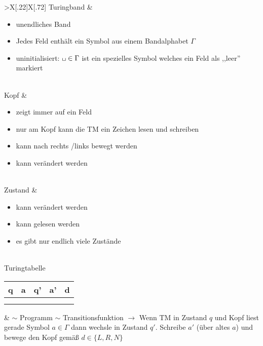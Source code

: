 \begin{tabu}{>{\bfseries}X[.22]X[.72]}
	Turingband & \vspace{-1em}\begin{itemize}[leftmargin=1em,parsep=0pt,topsep=0pt]
	\item unendliches Band
	\item Jedes Feld enthält ein Symbol aus einem Bandalphabet $\Gamma$
	\item uninitialisiert: $\blank\in\Gamma$  ist ein spezielles Symbol welches ein Feld als ,,leer'' markiert
	\end{itemize}
	\\
	Kopf & \vspace{-1em}\begin{itemize}[leftmargin=1em,parsep=0pt,topsep=0pt]
	\item zeigt immer auf ein Feld
	\item nur am Kopf kann die \ac{TM} ein Zeichen lesen und schreiben
	\item kann nach rechts /links bewegt werden
	\item kann verändert werden
	\end{itemize}\\
	Zustand & \vspace{-1em}\begin{itemize}[leftmargin=1em,parsep=0pt,topsep=0pt]
	\item kann verändert werden
	\item kann gelesen werden
	\item es gibt nur endlich viele Zustände
	\end{itemize}\\
	Turingtabelle\newline\normalfont
	\begin{tabular}{|*5{c|}}
		q & a & q' & a' & d \\\hline
		&&&&\\
		&&&&
	\end{tabular}
	& $\sim$ Programm $\sim$ Transitionsfunktion \newline
	$\rightarrow$ Wenn \ac{TM} in Zustand $q$ und Kopf liest gerade Symbol $a\in\Gamma$ dann wechsle in Zustand $q'$. Schreibe $a'$ (über altes $a$) und bewege den Kopf gemäß $d\in\{L,R,N\}$
\end{tabu}\

